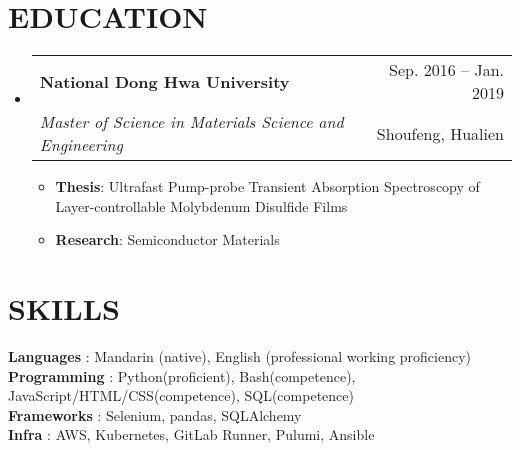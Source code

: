 \documentclass[letterpaper,11pt]{article}
\makeatletter
\newcommand{\resumeItem}[1]{
  \item\small{
    {#1 \vspace{-1pt}}
  }
}
\newcommand{\resumeSubheading}[4]{
  \vspace{-1pt}\item
    \begin{tabular*}{\textwidth}[t]{l@{\extracolsep{\fill}}r}
      \textbf{#1} & {\color{dark-grey}\small #2}\vspace{1pt}\\ %
      \textit{#3} & {\color{dark-grey} \small #4}\\ %
    \end{tabular*}\vspace{-4pt}
}
\newcommand{\resumeSubHeadingListStart}{\begin{itemize}[leftmargin=0in, label={}]}
\newcommand{\resumeSubHeadingListEnd}{\end{itemize}}
\newcommand{\resumeItemListStart}{\begin{itemize}}
\newcommand{\resumeItemListEnd}{\end{itemize}\vspace{0pt}}
\makeatother
\begin{document}
\section {EDUCATION}
\resumeSubHeadingListStart
\resumeSubheading
  {National Dong Hwa University}{Sep. 2016 -- Jan. 2019}
  {Master of Science in Materials Science and Engineering}{Shoufeng, Hualien}
    \resumeItemListStart
  \resumeItem {\textbf{Thesis}: Ultrafast Pump-probe Transient Absorption Spectroscopy of Layer-controllable Molybdenum Disulfide Films}
    \resumeItem 
        {\textbf{Research}: Semiconductor Materials }
    \resumeItemListEnd
\resumeSubHeadingListEnd

%
\section{SKILLS}
 \begin{itemize}[leftmargin=0in, label={}]
    \small{\item{
     \textbf{Languages} {: Mandarin (native), English (professional working proficiency)}\vspace{2pt} \\
     \textbf{Programming} {: Python(proficient), Bash(competence), JavaScript/HTML/CSS(competence), SQL(competence)}\vspace{2pt} \\
     \textbf{Frameworks}     {: Selenium, pandas, SQLAlchemy} \\
     \textbf{Infra}     {: AWS, Kubernetes, GitLab Runner, Pulumi, Ansible}
    }}
 \end{itemize}


\end{document}
